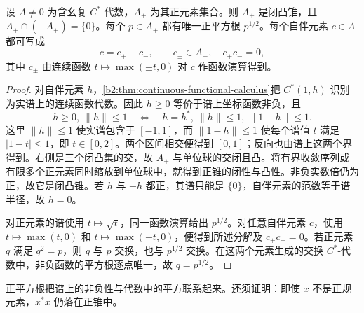 \begin{proposition}[正锥与连续函数演算]\label{b2:prop:cstar-positive-cone}
	设 \(A\ne0\) 为含幺复 \(C^*\)-代数，\(A_+\) 为其正元素集合。则 \(A_+\) 是闭凸锥，且 \(A_+\cap(-A_+)=\{0\}\)。每个 \(p\in A_+\) 都有唯一正平方根 \(p^{1/2}\)。每个自伴元素 \(c\in A\) 都可写成
	\[
		c=c_+-c_-,\qquad c_\pm\in A_+,\quad c_+c_-=0,
	\]
	其中 \(c_\pm\) 由连续函数 \(t\mapsto\max(\pm t,0)\) 对 \(c\) 作函数演算得到。
\end{proposition}
\begin{proof}
	对自伴元素 \(h\)，\cref{b2:thm:continuous-functional-calculus}把 \(C^*(1,h)\) 识别为实谱上的连续函数代数。因此 \(h\ge0\) 等价于谱上坐标函数非负，且
	\[
		h\ge0,\ \|h\|\le1 \quad\Longleftrightarrow\quad h=h^*,\ \|h\|\le1,\ \|1-h\|\le1.
	\]
	这里 \(\|h\|\le1\) 使实谱包含于 \([-1,1]\)，而 \(\|1-h\|\le1\) 使每个谱值 \(t\) 满足 \(|1-t|\le1\)，即 \(t\in[0,2]\)。两个区间相交便得到 \([0,1]\)；反向也由谱上这两个界得到。右侧是三个闭凸集的交，故 \(A_+\) 与单位球的交闭且凸。将有界收敛序列或有限多个正元素同时缩放到单位球中，就得到正锥的闭性与凸性。非负实数倍仍为正，故它是闭凸锥。若 \(h\) 与 \(-h\) 都正，其谱只能是 \(\{0\}\)，自伴元素的范数等于谱半径，故 \(h=0\)。

	对正元素的谱使用 \(t\mapsto\sqrt t\)，同一函数演算给出 \(p^{1/2}\)。对任意自伴元素 \(c\)，使用 \(t\mapsto\max(t,0)\) 和 \(t\mapsto\max(-t,0)\)，便得到所述分解及 \(c_+c_-=0\)。若正元素 \(q\) 满足 \(q^2=p\)，则 \(q\) 与 \(p\) 交换，也与 \(p^{1/2}\) 交换。在这两个元素生成的交换 \(C^*\)-代数中，非负函数的平方根逐点唯一，故 \(q=p^{1/2}\)。
\end{proof}

正平方根把谱上的非负性与代数中的平方联系起来。还须证明：即使 \(x\) 不是正规元素，\(x^*x\) 仍落在正锥中。

